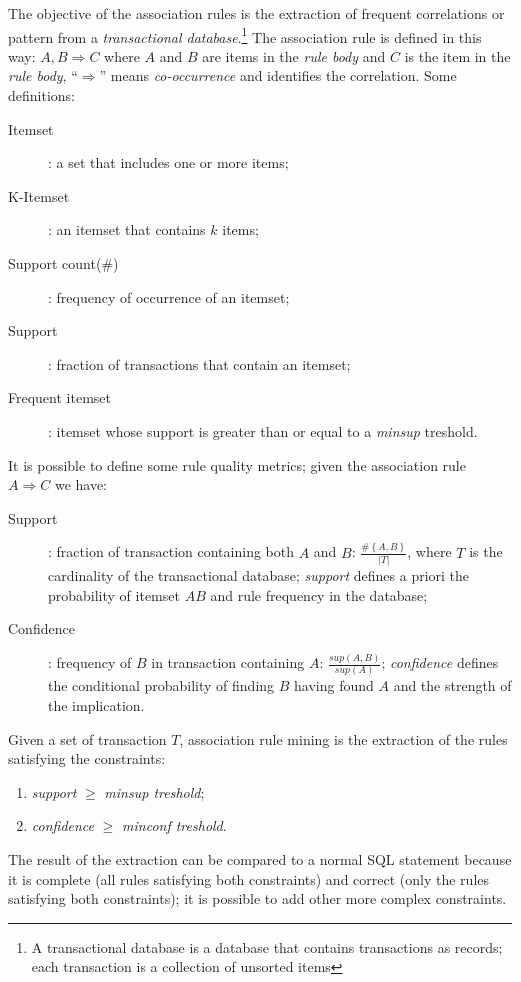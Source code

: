 The objective of the association rules is the extraction of frequent correlations or pattern from a \emph{transactional database}.\footnote{A transactional database is a database that contains transactions as records; each transaction is a collection of unsorted items}
The association rule is defined in this way: $A, B \Rightarrow C$ where $A$ and $B$ are items in the \emph{rule body} and $C$ is the item in the \emph{rule body}, ``$\Rightarrow$'' means \emph{co-occurrence} and identifies the correlation.
Some definitions:
\begin{description}
	\item[Itemset]: a set that includes one or more items;
	\item[K-Itemset]: an itemset that contains $k$ items;
	\item[Support count(\#)]: frequency of occurrence of an itemset;
	\item[Support]: fraction of transactions that contain an itemset;
	\item[Frequent itemset]: itemset whose support is greater than or equal to a \emph{minsup} treshold.
\end{description}
It is possible to define some rule quality metrics; given the association rule $A \Rightarrow C$ we have:
\begin{description}
	\item[Support]: fraction of transaction containing both $A$ and $B$: $\frac{\#\left\{A, B\right\}}{|T|}$, where $T$ is the cardinality of the transactional database; \emph{support} defines a priori the probability of itemset $AB$ and rule frequency in the database;
	\item[Confidence]: frequency of $B$ in transaction containing $A$: $\frac{sup\left(A, B\right)}{sup\left(A\right)}$; \emph{confidence} defines the conditional probability of finding $B$ having found $A$ and the strength of the implication.
\end{description}
Given a set of transaction $T$, association rule mining is the extraction of the rules satisfying the constraints:
\begin{enumerate}
	\item \emph{support} $\geq$ \emph{minsup treshold};
	\item \emph{confidence} $\geq$ \emph{minconf treshold}.
\end{enumerate}
The result of the extraction can be compared to a normal SQL statement because it is complete (all rules satisfying both constraints) and correct (only the rules satisfying both constraints); it is possible to add other more complex constraints.
